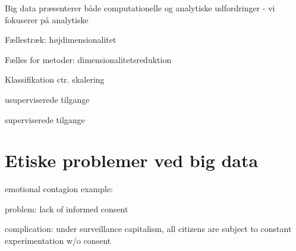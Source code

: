 \documentclass[12pt,]{article}
\begin{document}
Big data præsenterer både computationelle og analytiske udfordringer -
vi fokuserer på analytiske

Fællestræk: højdimensionalitet

Fælles for metoder: dimensionalitetsreduktion

Klassifikation ctr. skalering

usuperviserede tilgange

superviserede tilgange

\hypertarget{etiske-problemer-ved-big-data}{%
\section{Etiske problemer ved big
data}\label{etiske-problemer-ved-big-data}}

emotional contagion example: \citet{kramer2014experimental}

problem: lack of informed consent

complication: under surveillance capitalism, all citizens are subject to
constant experimentation w/o consent


\end{document}
